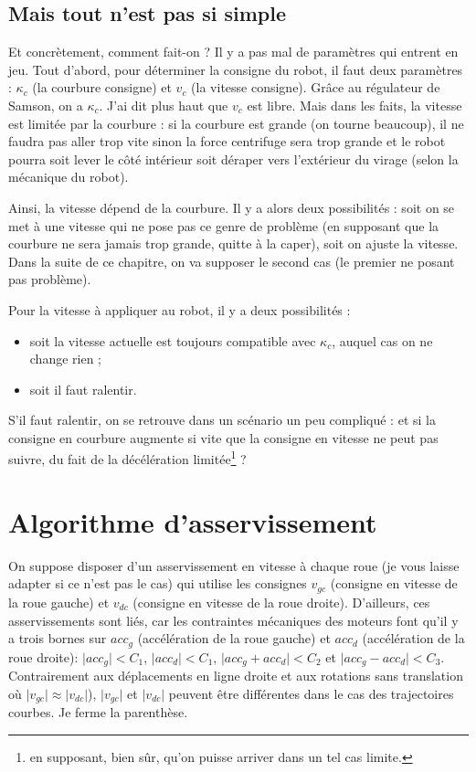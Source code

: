 \documentclass[11pt]{article}
\begin{document}
    \subsection{Mais tout n'est pas si simple}

    Et concrètement, comment fait-on ? Il y a pas mal de paramètres qui entrent en jeu. Tout d'abord, pour déterminer la consigne du robot, il faut deux paramètres : $\kappa_c$ (la courbure consigne) et $v_c$ (la vitesse consigne). Grâce au régulateur de Samson, on a $\kappa_c$. J'ai dit plus haut que $v_c$ est libre. Mais dans les faits, la vitesse est limitée par la courbure : si la courbure est grande (on tourne beaucoup), il ne faudra pas aller trop vite sinon la force centrifuge sera trop grande et le robot pourra soit lever le côté intérieur soit déraper vers l'extérieur du virage (selon la mécanique du robot).

    Ainsi, la vitesse dépend de la courbure. Il y a alors deux possibilités : soit on se met à une vitesse qui ne pose pas ce genre de problème (en supposant que la courbure ne sera jamais trop grande, quitte à la caper), soit on ajuste la vitesse. Dans la suite de ce chapitre, on va supposer le second cas (le premier ne posant pas problème).

    Pour la vitesse à appliquer au robot, il y a deux possibilités :
    \begin{itemize}
        \item soit la vitesse actuelle est toujours compatible avec $\kappa_c$, auquel cas on ne change rien ;
        \item soit il faut ralentir.
    \end{itemize}

    S'il faut ralentir, on se retrouve dans un scénario un peu compliqué : et si la consigne en courbure augmente si vite que la consigne en vitesse ne peut pas suivre, du fait de la décélération limitée\footnote{en supposant, bien sûr, qu'on puisse arriver dans un tel cas limite.} ?

    \section{Algorithme d'asservissement}\label{sec:algorithmeD'asservissement}

    On suppose disposer d'un asservissement en vitesse à chaque roue (je vous laisse adapter si ce n'est pas le cas) qui utilise les consignes $v_{gc}$ (consigne en vitesse de la roue gauche) et $v_{dc}$ (consigne en vitesse de la roue droite). D'ailleurs, ces asservissements sont liés, car les contraintes mécaniques des moteurs font qu'il y a trois bornes sur $acc_g$ (accélération de la roue gauche) et $acc_d$ (accélération de la roue droite): $\vert acc_g \vert < C_1$, $\vert acc_d \vert < C_1$, $\vert acc_g + acc_d \vert < C_2$ et $\vert acc_g - acc_d \vert < C_3$. Contrairement aux déplacements en ligne droite et aux rotations sans translation où $\vert v_{gc} \vert \approx \vert v_{dc} \vert$), $\vert v_{gc} \vert$ et $\vert v_{dc} \vert$ peuvent être différentes dans le cas des trajectoires courbes.
    Je ferme la parenthèse.
\end{document}
